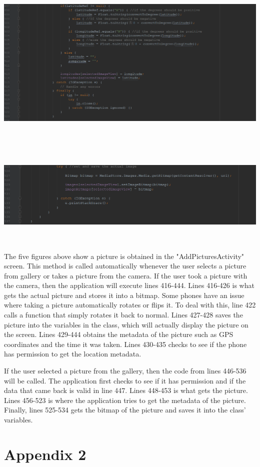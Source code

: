 \documentclass[onecolumn, draftclsnofoot,10pt, compsoc]{IEEEtran}
\begin{document}
\begin{center}
\includegraphics[height=8cm]{onactivityresults4.png}
\end{center}

\begin{center}
\includegraphics[height=5cm, width=18cm]{onactivityresults5.png}
\end{center}
The five figures above show a picture is obtained in the "AddPicturesActivity" screen. This method is called automatically whenever the user selects a picture from gallery or takes a picture from the camera. If the user took a picture with the camera, then the application will execute lines 416-444. Lines 416-426 is what gets the actual picture and stores it into a bitmap. Some phones have an issue where taking a picture automatically rotates or flips it. To deal with this, line 422 calls a function that simply rotates it back to normal. Lines 427-428 saves the picture into the variables in the class, which will actually display the picture on the screen. Lines 429-444 obtains the metadata of the picture such as GPS coordinates and the time it was taken. Lines 430-435 checks to see if the phone has permission to get the location metadata.

If the user selected a picture from the gallery, then the code from lines 446-536 will be called. The application first checks to see if it has permission and if the data that came back is valid in line 447. Lines 448-453 is what gets the picture. Lines 456-523 is where the application tries to get the metadata of the picture. Finally, lines 525-534 gets the bitmap of the picture and saves it into the class' variables.

 \section{Appendix 2}
 
 

\end{document}
